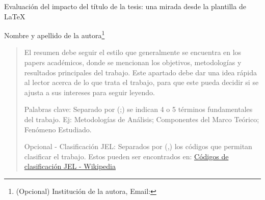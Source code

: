 \renewcommand{\thefootnote}{\fnsymbol{footnote}}

\begin{center}

\normalsize Evaluación del impacto del título de la tesis: una mirada desde la plantilla de \LaTeX

\vspace{6mm}

\small Nombre y apellido de la autora\footnote{(Opcional) Institución de la autora, Email:}
    
\end{center}

\vspace{1.5mm}


\renewcommand{\abstractname}{Resumen}
\begin{abstract}

\footnotesize \noindent  El resumen debe seguir el estilo que generalmente se encuentra en los papers académicos, donde se mencionan los objetivos, metodologías y resultados principales del trabajo. Este apartado debe dar una idea rápida al lector acerca de lo que trata el trabajo, para que este pueda decidir si se ajusta a sus intereses para seguir leyendo.

\vspace{3mm}

\noindent Palabras clave: Separado por (;) se indican 4 o 5 términos fundamentales del trabajo. Ej: Metodologías de Análisis; Componentes del Marco Teórico; Fenómeno Estudiado. 

\vspace{1.5mm}

\noindent Opcional - Clasificación JEL: Separados por (,) los códigos que permitan clasificar el trabajo. Estos pueden ser encontrados en: \href{https://es.wikipedia.org/wiki/Códigos_de_clasificación_JEL}{Códigos de clasificación JEL - Wikipedia}

\end{abstract}

\vspace{3mm}


